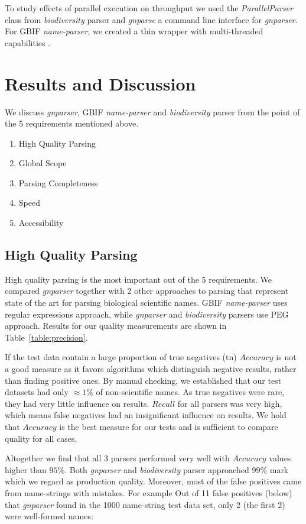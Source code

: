 \documentclass{bmcart}
\begin{document}
To study effects of parallel execution on throughput we used the
\textit{ParallelParser} class from \textit{biodiversity} parser and
\textit{gnparse} a command line interface for \textit{gnparser}. For GBIF
\textit{name-parser}, we created a thin wrapper with multi-threaded
capabilities \cite{gbifparser}.

\section*{Results and Discussion}

We discuss \textit{gnparser}, GBIF \textit{name-parser} and
\textit{biodiversity} parser from the point of the 5 requirements mentioned
above.

\begin{enumerate}
  \item High Quality Parsing
  \item Global Scope
  \item Parsing Completeness
  \item Speed
  \item Accessibility
\end{enumerate}

\subsection*{High Quality Parsing}

High quality parsing is the most important out of the 5 requirements.  We
compared \textit{gnparser} together with 2 other approaches to parsing that
represent state of the art for parsing biological scientific names. GBIF
\textit{name-parser} uses regular expressions approach, while \textit{gnparser}
and \textit{biodiversity} parsers use PEG approach.  Results for our quality
measurements are shown in Table~\ref{table:precision}.

If the test data contain a large proportion of true negatives ($\text{tn}$)
$Accuracy$ is not a good measure as it favors algorithms which distinguish
negative results, rather than finding positive ones. By manual checking, we
established that our test datasets had only $\approx1\%$ of non-scientific
names. As true negatives were rare, they had very little influence on results.
$Recall$ for all parsers was very high, which means false negatives had an
insignificant influence on results. We hold that $Accuracy$ is the best measure
for our tests and is sufficient to compare quality for all cases.

Altogether we find that all 3 parsers performed very well with $Accuracy$
values higher than $95\%$. Both \textit{gnparser} and \textit{biodiversity}
parser approached 99\% mark which we regard as production quality. Moreover,
most of the false positives came from name-strings with mistakes. For example
Out of 11 false positives (below) that \textit{gnparser} found in the 1000
name-string test data set, only 2 (the first 2) were well-formed names:
\end{document}
